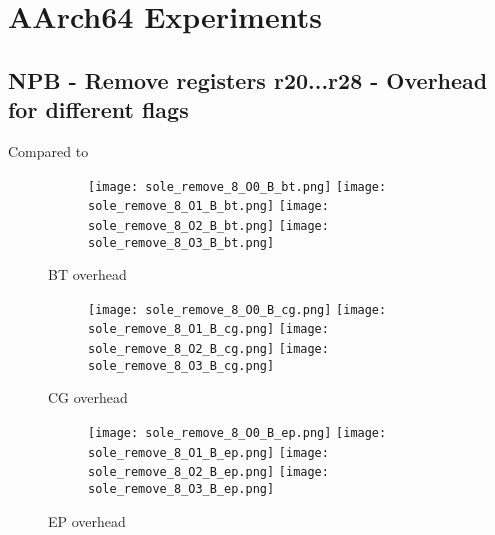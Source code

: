 \documentclass[11pt]{article}
\begin{document}
    \section*{AArch64 Experiments}

%
%
    \subsection*{NPB - Remove registers r20...r28 - Overhead for different flags}

    Compared to

    \begin{figure}[!htb]
        \begin{subfigure}{\linewidth}
            \texttt{[image: sole\_remove\_8\_O0\_B\_bt.png]}\hfill
            \texttt{[image: sole\_remove\_8\_O1\_B\_bt.png]}\hfill
            \texttt{[image: sole\_remove\_8\_O2\_B\_bt.png]}\hfill
            \texttt{[image: sole\_remove\_8\_O3\_B\_bt.png]}\hfill
        \end{subfigure}\par\medskip
        \caption{BT overhead}
    \end{figure}

    \begin{figure}[!htb]
        \begin{subfigure}{\linewidth}
            \texttt{[image: sole\_remove\_8\_O0\_B\_cg.png]}\hfill
            \texttt{[image: sole\_remove\_8\_O1\_B\_cg.png]}\hfill
            \texttt{[image: sole\_remove\_8\_O2\_B\_cg.png]}\hfill
            \texttt{[image: sole\_remove\_8\_O3\_B\_cg.png]}\hfill
        \end{subfigure}\par\medskip
        \caption{CG overhead}
    \end{figure}
\begin{figure}[!htb]
        \begin{subfigure}{\linewidth}
            \texttt{[image: sole\_remove\_8\_O0\_B\_ep.png]}\hfill
            \texttt{[image: sole\_remove\_8\_O1\_B\_ep.png]}\hfill
            \texttt{[image: sole\_remove\_8\_O2\_B\_ep.png]}\hfill
            \texttt{[image: sole\_remove\_8\_O3\_B\_ep.png]}\hfill
        \end{subfigure}\par\medskip
        \caption{EP overhead}
\end{figure}
\end{document}

